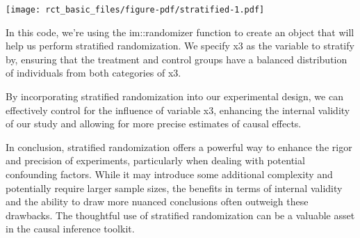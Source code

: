 \documentclass[
  letterpaper,
  DIV=11,
  numbers=noendperiod]{scrreprt}
\newenvironment{Shaded}{\begin{snugshade}}{\end{snugshade}}
\newcommand{\AttributeTok}[1]{\textcolor[rgb]{0.40,0.45,0.13}{#1}}
\newcommand{\CommentTok}[1]{\textcolor[rgb]{0.37,0.37,0.37}{#1}}
\newcommand{\DecValTok}[1]{\textcolor[rgb]{0.68,0.00,0.00}{#1}}
\newcommand{\FunctionTok}[1]{\textcolor[rgb]{0.28,0.35,0.67}{#1}}
\newcommand{\NormalTok}[1]{\textcolor[rgb]{0.00,0.23,0.31}{#1}}
\newcommand{\OtherTok}[1]{\textcolor[rgb]{0.00,0.23,0.31}{#1}}
\newcommand{\SpecialCharTok}[1]{\textcolor[rgb]{0.37,0.37,0.37}{#1}}
\newcommand{\StringTok}[1]{\textcolor[rgb]{0.13,0.47,0.30}{#1}}
\begin{document}
\begin{Shaded}
\end{Shaded}

\texttt{[image: rct\_basic\_files/figure-pdf/stratified-1.pdf]}

In this code, we're using the im::randomizer function to create an
object that will help us perform stratified randomization. We specify x3
as the variable to stratify by, ensuring that the treatment and control
groups have a balanced distribution of individuals from both categories
of x3.

By incorporating stratified randomization into our experimental design,
we can effectively control for the influence of variable x3, enhancing
the internal validity of our study and allowing for more precise
estimates of causal effects.

In conclusion, stratified randomization offers a powerful way to enhance
the rigor and precision of experiments, particularly when dealing with
potential confounding factors. While it may introduce some additional
complexity and potentially require larger sample sizes, the benefits in
terms of internal validity and the ability to draw more nuanced
conclusions often outweigh these drawbacks. The thoughtful use of
stratified randomization can be a valuable asset in the causal inference
toolkit.
\end{document}
